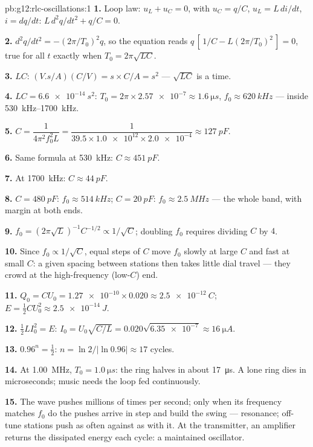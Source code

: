 \begin{solution}{pb:g12:rlc-oscillations:1}
\textbf{1.} Loop law: $u_L + u_C = 0$, with $u_C = q/C$,
$u_L = L\,di/dt$, $i = dq/dt$: $L\,d^2q/dt^2 + q/C = 0$.

\textbf{2.} $d^2q/dt^2 = -(2\pi/T_0)^2 q$, so the equation reads
$q\,[\,1/C - L(2\pi/T_0)^2\,] = 0$, true for all $t$ exactly when
$T_0 = 2\pi\sqrt{LC}$.

\textbf{3.} $LC$: $(\unit{V.s/A})(\unit{C/V}) = \unit{s} \times
\unit{C/A} = \unit{s^2}$ --- $\sqrt{LC}$ is a time.

\textbf{4.} $LC = \qty{6.6e-14}{s^2}$: $T_0 = 2\pi \times \num{2.57e-7}
\approx \qty{1.6}{\micro s}$, $f_0 \approx \qty{620}{kHz}$ --- inside
\qtyrange{530}{1700}{kHz}.

\textbf{5.} $C = \dfrac{1}{4\pi^2 f_0^2 L} = \dfrac{1}{39.5 \times
\num{1.0e12} \times \num{2.0e-4}} \approx \qty{127}{pF}$.

\textbf{6.} Same formula at \qty{530}{kHz}: $C \approx \qty{451}{pF}$.

\textbf{7.} At \qty{1700}{kHz}: $C \approx \qty{44}{pF}$.

\textbf{8.} $C = \qty{480}{pF}$: $f_0 \approx \qty{514}{kHz}$;
$C = \qty{20}{pF}$: $f_0 \approx \qty{2.5}{MHz}$ --- the whole band,
with margin at both ends.

\textbf{9.} $f_0 = (2\pi\sqrt{L})^{-1}C^{-1/2} \propto 1/\sqrt{C}$;
doubling $f_0$ requires dividing $C$ by $4$.

\textbf{10.} Since $f_0 \propto 1/\sqrt{C}$, equal steps of $C$ move
$f_0$ slowly at large $C$ and fast at small $C$: a given spacing
between stations then takes little dial travel --- they crowd at the
high-frequency (low-$C$) end.

\textbf{11.} $Q_0 = CU_0 = \num{1.27e-10} \times 0.020 \approx
\qty{2.5e-12}{C}$; $E = \tfrac12 CU_0^2 \approx \qty{2.5e-14}{J}$.

\textbf{12.} $\tfrac12 LI_0^2 = E$: $I_0 = U_0\sqrt{C/L} =
0.020\sqrt{\num{6.35e-7}} \approx \qty{16}{\micro A}$.

\textbf{13.} $0.96^n = \tfrac12$: $n = \ln 2/\lvert\ln 0.96\rvert
\approx 17$ cycles.

\textbf{14.} At \qty{1.00}{MHz}, $T_0 = \qty{1.0}{\micro s}$: the ring
halves in about \qty{17}{\micro s}. A lone ring dies in microseconds;
music needs the loop fed continuously.

\textbf{15.} The wave pushes millions of times per second; only when
its frequency matches $f_0$ do the pushes arrive in step and build the
swing --- resonance; off-tune stations push as often against as with
it. At the transmitter, an amplifier returns the dissipated energy
each cycle: a maintained oscillator.


\end{solution}
